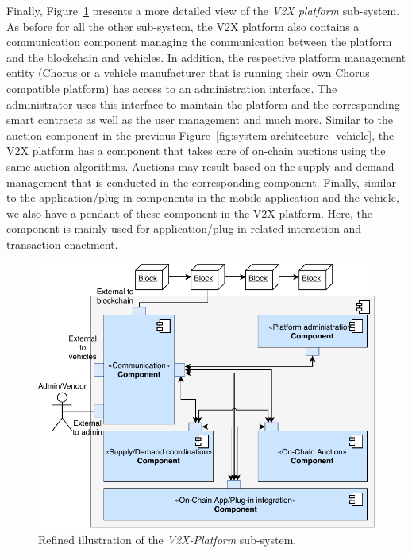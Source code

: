 \documentclass{llncs}
\begin{document}
{				Finally, Figure~\ref{fig:system-architecture--platform} presents a more detailed view of the \textit{V2X platform} sub-system. As before for all the other sub-system, the V2X platform also contains a communication component managing the communication between the platform and the blockchain and vehicles. In addition, the respective platform management entity (Chorus or a vehicle manufacturer that is running their own Chorus compatible platform) has access to an administration interface. The administrator uses this interface to maintain the platform and the corresponding smart contracts as well as the user management and much more. Similar to the auction component in the previous Figure~\ref{fig:system-architecture--vehicle}, the V2X platform has a component that takes care of on-chain auctions using the same auction algorithms. Auctions may result based on the supply and demand management that is conducted in the corresponding component. Finally, similar to the application/plug-in components in the mobile application and the vehicle, we also have a pendant of these component in the V2X platform. Here, the component is mainly used for application/plug-in related interaction and transaction enactment.
				
				\begin{figure}
					\centering
					\includegraphics[scale=0.75]{Figures/longterm-architecture/20180507_Refined-sys-architecture--V2X.pdf}
					\caption{Refined illustration of the \textit{V2X-Platform} sub-system.}	
					\label{fig:system-architecture--platform}
				\end{figure}						

}
\end{document}
